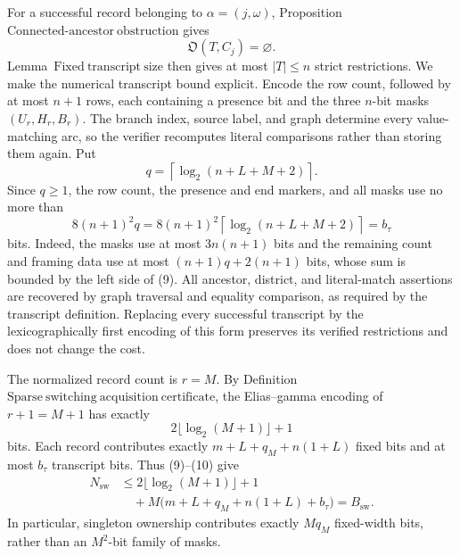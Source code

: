 For a successful record belonging to \(\alpha=(j,\omega)\), Proposition~\(\mathrm{Connected\mbox{-}ancestor\ obstruction}\) gives
\[
 \mathfrak O(T,C_j)=\varnothing.
 \tag{7}
\]
Lemma~\(\mathrm{Fixed\ transcript\ size}\) then gives at most \(|T|\leq n\) strict restrictions.  We make the numerical transcript bound explicit.  Encode the row count, followed by at most \(n+1\) rows, each containing a presence bit and the three \(n\)-bit masks \((U_r,H_r,B_r)\).  The branch index, source label, and graph determine every value-matching arc, so the verifier recomputes literal comparisons rather than storing them again.  Put
\[
 q=\left\lceil\log_2(n+L+M+2)\right\rceil.
 \tag{8}
\]
Since \(q\geq1\), the row count, the presence and end markers, and all masks use no more than
\[
 8(n+1)^2q
 =8(n+1)^2\left\lceil\log_2(n+L+M+2)\right\rceil
 =b_{\tau}
 \tag{9}
\]
bits.  Indeed, the masks use at most \(3n(n+1)\) bits and the remaining count and framing data use at most \((n+1)q+2(n+1)\) bits, whose sum is bounded by the left side of (9).  All ancestor, district, and literal-match assertions are recovered by graph traversal and equality comparison, as required by the transcript definition.  Replacing every successful transcript by the lexicographically first encoding of this form preserves its verified restrictions and does not change the cost.

The normalized record count is \(r=M\).  By Definition~\(\mathrm{Sparse\ switching\ acquisition\ certificate}\), the Elias--gamma encoding of \(r+1=M+1\) has exactly
\[
 2\lfloor\log_2(M+1)\rfloor+1
 \tag{10}
\]
bits.  Each record contributes exactly
\(m+L+q_M+n(1+L)\) fixed bits and at most \(b_{\tau}\) transcript bits.  Thus (9)--(10) give
\[
\begin{aligned}
 N_{\mathrm{sw}}
 &\leq 2\lfloor\log_2(M+1)\rfloor+1\\
 &\quad+M\bigl(m+L+q_M+n(1+L)+b_{\tau}\bigr)
 =B_{\mathrm{sw}}.
\end{aligned}
\tag{11}
\]
In particular, singleton ownership contributes exactly \(Mq_M\) fixed-width bits, rather than an \(M^2\)-bit family of masks.

